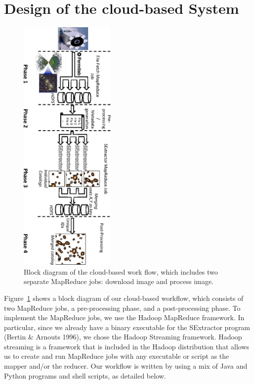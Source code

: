 \documentclass[11pt,twoside]{article}
\begin{document}
\section{Design of the cloud-based System}

\begin{figure}[t!]
	\vspace{0.1in}
	\centering
	\includegraphics[height=5.0in, angle=90]{Diagram}
	\caption{Block diagram of the cloud-based work flow, which includes two separate MapReduce jobs: download image  and  process image.}
	\label{bdiagram}
\end{figure}


Figure~\ref{bdiagram} shows a block diagram of our cloud-based workflow, which consists of two MapReduce jobs, a pre-processing phase, and a post-processing phase.
To implement the MapReduce jobs, we use the Hadoop MapReduce framework. In particular, since we already have a binary executable for the SExtractor program (Bertin \& Arnouts 1996), we chose the Hadoop Streaming framework. 
Hadoop streaming is a framework that is included in the Hadoop distribution that allows us to create and run MapReduce jobs with any executable or script as the mapper and/or the reducer. Our workflow is written by using a mix of Java and Python programs and shell scripts, as detailed below.
\end{document}
